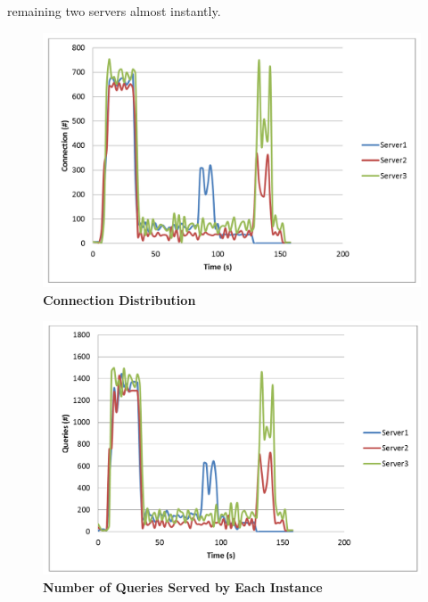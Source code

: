 \documentclass[12pt]{article}
\begin{document}
remaining two servers almost instantly.  \vspace{35mm} \begin{multicols}{2}
\begin{figure}[H] 
\centering
\includegraphics[scale=0.35]{Images/graph_lb_conns.PNG}
\caption{\textbf{Connection Distribution}  } 
\label{fig:lb_conns} 
\end{figure}

\begin{figure}[H] 
\centering
\includegraphics[scale=0.35]{Images/graph_lb_queries.PNG}
\caption{\textbf{Number of Queries Served by Each Instance} }
\label{fig:lb_queries} 
\end{figure} 
\end{multicols}
\end{document}
